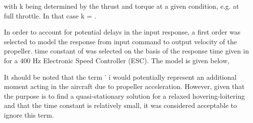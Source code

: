 \documentclass[12pt,a4paper,twoside]{report}
\begin{document}
				with k being determined by the thrust and torque at a given condition, e.g. at full
				throttle. In that case k = .
				
				In order to account for potential delays in the input response, a first order was
				selected to model the response from input command to output velocity of the propeller. 
				time constant of was selected on the basis of the response time given
				in for a 400 Hz Electronic Speed Controller (ESC). The model is given below,

				It should be noted that the term ˙
				i would potentially represent an additional moment acting in the aircraft due to propeller acceleration. However, given that the
				purpose is to find a quasi-stationary solution for a relaxed hovering-loitering and
				that the time constant is relatively small, it was considered acceptable to ignore
				this term.
  		
				
				
			
				
	
				
\end{document}
